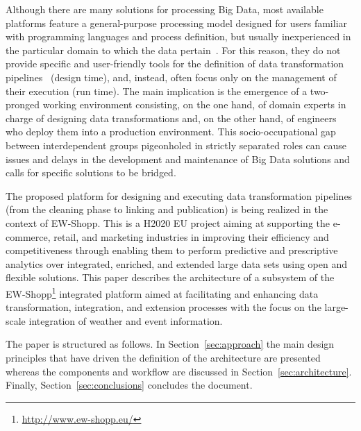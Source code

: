 Although there are many solutions for processing Big Data, most available platforms feature a general-purpose processing model designed for users familiar with programming languages and process definition, but usually inexperienced in the particular domain to which the data pertain~\cite{sukhobok2016tabular}. For this reason, they do not provide specific and user-friendly tools for the definition of data transformation pipelines~\cite{rahm2000data} (design time), and, instead, often focus only on the management of their execution (run time). The main implication is the emergence of a two-pronged working environment consisting, on the one hand, of domain experts in charge of designing data transformations and, on the other hand, of engineers who deploy them into a production environment. This socio-occupational gap between interdependent groups pigeonholed in strictly separated roles can cause issues and delays in the development and maintenance of Big Data solutions and calls for specific solutions to be bridged.  

The proposed platform for designing and executing data transformation pipelines (from the cleaning phase to linking and publication) is being realized in the context of EW-Shopp. This is a H2020 EU project aiming at supporting the e-commerce, retail, and marketing industries in improving their efficiency and competitiveness through enabling them to perform predictive and prescriptive analytics over integrated, enriched, and extended large data sets using open and flexible solutions. 
This paper describes the architecture of a subsystem of the EW-Shopp\footnote{\url{http://www.ew-shopp.eu/}} integrated platform aimed at facilitating and enhancing data transformation, integration, and extension processes with the focus on the large-scale integration of weather and event information.

The paper is structured as follows. 
In Section~\ref{sec:approach} the main design principles that have driven the definition of the architecture are presented whereas the components and workflow are discussed in Section~\ref{sec:architecture}. %
Finally, Section~\ref{sec:conclusions} concludes the document. 








